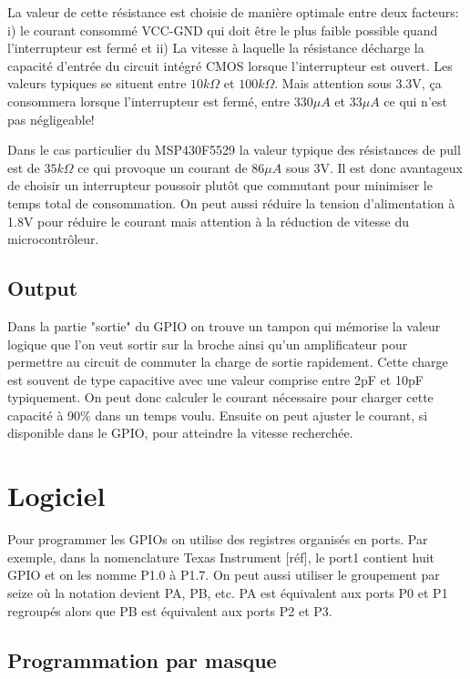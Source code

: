 La valeur de cette résistance est choisie de manière optimale entre deux facteurs: i) le courant consommé VCC-GND qui doit être le plus faible possible quand l'interrupteur est fermé et ii) La vitesse à laquelle la résistance décharge la capacité d'entrée du circuit intégré CMOS lorsque l'interrupteur est ouvert. Les valeurs typiques se situent entre $10k\Omega$ et $100k\Omega$. Mais attention sous 3.3V, ça consommera lorsque l'interrupteur est fermé, entre $330\mu A$ et $33\mu A$ ce qui n'est pas négligeable!

Dans le cas particulier du MSP430F5529 la valeur typique des résistances de pull est de $35k\Omega$ ce qui provoque un courant de $86\mu A$ sous 3V. Il est donc avantageux de choisir un interrupteur poussoir plutôt que commutant pour minimiser le temps total de consommation. On peut aussi réduire la tension d'alimentation à 1.8V pour réduire le courant mais attention à la réduction de vitesse du microcontrôleur.

\subsection{Output}

Dans la partie "sortie" du GPIO on trouve un tampon qui mémorise la valeur logique que l'on veut sortir sur la broche ainsi qu'un amplificateur pour permettre au circuit de commuter la charge de sortie rapidement. Cette charge est souvent de type capacitive avec une valeur comprise entre 2pF et 10pF typiquement. On peut donc calculer le courant nécessaire pour charger cette capacité à 90\% dans un temps voulu. Ensuite on peut ajuster le courant, si disponible dans le GPIO, pour atteindre la vitesse recherchée.

\section{Logiciel}

Pour programmer les GPIOs on utilise des registres organisés en ports. Par exemple, dans la nomenclature Texas Instrument [réf], le port1 contient huit GPIO et on les nomme P1.0 à P1.7. On peut aussi utiliser le groupement par seize où la notation devient PA, PB, etc. PA est équivalent aux ports P0 et P1 regroupés alors que PB est équivalent aux ports P2 et P3. 

\subsection{Programmation par masque}


